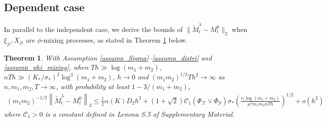 \documentclass[12pt]{article}
\newtheorem{thm}{Theorem}
\begin{document}
\subsection{Dependent case}
\label{sec:dependent}
  In parallel to the independent case, we derive the bounds of  $\|\widetilde{M}_t^\lambda - M_t^0\|_2$ when $\xi_{ji},X_{ji}$ are $\phi$-mixing processes, as stated in Theorem \ref{thm_phi_mixing} below.

  \begin{thm}
  \label{thm_phi_mixing}
  With Assumption \ref{assump_Sigma}--\ref{assump_distri} and \ref{assump_phi_mixing}, when $Th\gg\log(m_1+m_2)$, $nTh \gg \left(K_*/\sigma_*\right)^2\log^3 (m_1+m_2)$, $h\rightarrow0$ and $(m_1m_2)^{1/2}Th^2\rightarrow\infty$ as $n,m_1,m_2,T\rightarrow\infty$,
  with probability at least $1-3/(m_1+m_2)$,
  \begin{equation}\label{eq_phi_mixing}
  \begin{aligned}
  (m_1m_2)^{-1/2}\left\|\widetilde{M}_t^\lambda - M_t^0\right\|_2 \le \frac{1}{2}\alpha(K) D_2 h^2 + (1+\sqrt{2})\mathcal{C}_1(\Phi_{\mathcal{X}}\vee \Phi_{\mathcal{Y}}) \sigma_*\left(\frac{r_t\log(m_1+m_2)}{\mu^2m_1m_2nTh}\right)^{1/2}+o(h^2)
  \end{aligned}
  \end{equation}
  where $\mathcal{C}_1>0$ is a constant defined in Lemma S.5 of Supplementary Material.
  \end{thm}
\end{document}
